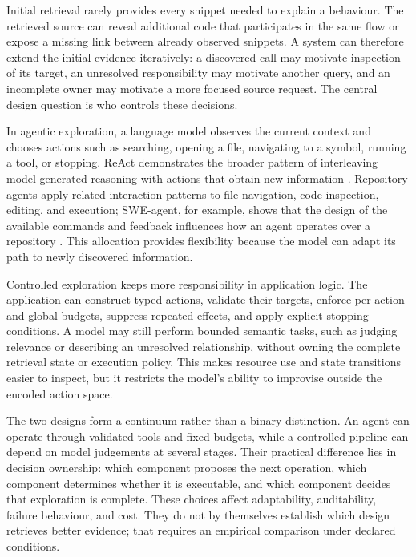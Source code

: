 Initial retrieval rarely provides every snippet needed to explain a behaviour. The retrieved source can reveal additional code that participates in the same flow or expose a missing link between already observed snippets. A system can therefore extend the initial evidence iteratively: a discovered call may motivate inspection of its target, an unresolved responsibility may motivate another query, and an incomplete owner may motivate a more focused source request. The central design question is who controls these decisions.

In agentic exploration, a language model observes the current context and chooses actions such as searching, opening a file, navigating to a symbol, running a tool, or stopping. ReAct demonstrates the broader pattern of interleaving model-generated reasoning with actions that obtain new information \textcite{Yao2023ReAct}. Repository agents apply related interaction patterns to file navigation, code inspection, editing, and execution; SWE-agent, for example, shows that the design of the available commands and feedback influences how an agent operates over a repository \textcite{Yang2024SWEAgent}. This allocation provides flexibility because the model can adapt its path to newly discovered information.

Controlled exploration keeps more responsibility in application logic. The application can construct typed actions, validate their targets, enforce per-action and global budgets, suppress repeated effects, and apply explicit stopping conditions. A model may still perform bounded semantic tasks, such as judging relevance or describing an unresolved relationship, without owning the complete retrieval state or execution policy. This makes resource use and state transitions easier to inspect, but it restricts the model's ability to improvise outside the encoded action space.

The two designs form a continuum rather than a binary distinction. An agent can operate through validated tools and fixed budgets, while a controlled pipeline can depend on model judgements at several stages. Their practical difference lies in decision ownership: which component proposes the next operation, which component determines whether it is executable, and which component decides that exploration is complete. These choices affect adaptability, auditability, failure behaviour, and cost. They do not by themselves establish which design retrieves better evidence; that requires an empirical comparison under declared conditions.

